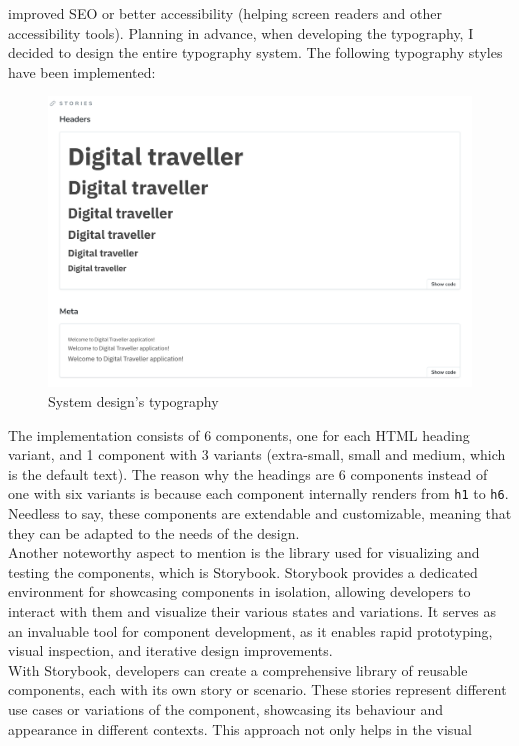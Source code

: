 \documentclass[./memory.tex]{subfiles}
\begin{document}
improved SEO or better accessibility (helping screen readers and other
accessibility tools). Planning in advance, when developing the typography, I
decided to design the entire typography system. The following typography styles
have been implemented:
\begin{figure}[H]
	\centering
	\includegraphics[width=\textwidth]{./assets/designs/typography.png}
	\caption{System design's typography}
\end{figure}
The implementation consists of 6 components, one for each HTML heading variant,
and 1 component with 3 variants (extra-small, small and medium, which is the
default text). The reason why the headings are 6 components instead of one with
six variants is because each component internally renders from \texttt{h1} to
\texttt{h6}. Needless to say, these components are extendable and customizable,
meaning that they can be adapted to the needs of the design.
\\[8pt]
Another noteworthy aspect to mention is the library used for visualizing and
testing the components, which is Storybook. Storybook provides a dedicated
environment for showcasing components in isolation, allowing developers to
interact with them and visualize their various states and variations. It serves
as an invaluable tool for component development, as it enables rapid
prototyping, visual inspection, and iterative design improvements.
\\
With Storybook, developers can create a comprehensive library of reusable
components, each with its own story or scenario. These stories represent
different use cases or variations of the component, showcasing its behaviour and
appearance in different contexts. This approach not only helps in the visual
\end{document}
